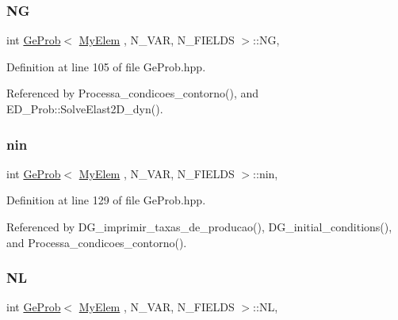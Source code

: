 \subsubsection{\texorpdfstring{NG}{NG}}
{\footnotesize\ttfamily int \hyperlink{classGeProb}{Ge\+Prob}$<$ \hyperlink{DG__Prob_8h_a83cd887ced9a6587428f267e50cd4787}{My\+Elem} , N\+\_\+\+V\+AR, N\+\_\+\+F\+I\+E\+L\+DS $>$\+::NG\hspace{0.3cm}{\ttfamily [protected]}, {\ttfamily [inherited]}}



Definition at line 105 of file Ge\+Prob.\+hpp.



Referenced by Processa\+\_\+condicoes\+\_\+contorno(), and E\+D\+\_\+\+Prob\+::\+Solve\+Elast2\+D\+\_\+dyn().

\mbox{\label{classGeProb_a2434630926ff59b81f12420354f533a7}} 
\subsubsection{\texorpdfstring{nin}{nin}}
{\footnotesize\ttfamily int \hyperlink{classGeProb}{Ge\+Prob}$<$ \hyperlink{DG__Prob_8h_a83cd887ced9a6587428f267e50cd4787}{My\+Elem} , N\+\_\+\+V\+AR, N\+\_\+\+F\+I\+E\+L\+DS $>$\+::nin\hspace{0.3cm}{\ttfamily [protected]}, {\ttfamily [inherited]}}



Definition at line 129 of file Ge\+Prob.\+hpp.



Referenced by D\+G\+\_\+imprimir\+\_\+taxas\+\_\+de\+\_\+producao(), D\+G\+\_\+initial\+\_\+conditions(), and Processa\+\_\+condicoes\+\_\+contorno().

\mbox{\label{classGeProb_a4608e6b80b16c86a7bd7451adebc6f69}} 
\subsubsection{\texorpdfstring{NL}{NL}}
{\footnotesize\ttfamily int \hyperlink{classGeProb}{Ge\+Prob}$<$ \hyperlink{DG__Prob_8h_a83cd887ced9a6587428f267e50cd4787}{My\+Elem} , N\+\_\+\+V\+AR, N\+\_\+\+F\+I\+E\+L\+DS $>$\+::NL\hspace{0.3cm}{\ttfamily [protected]}, {\ttfamily [inherited]}}




